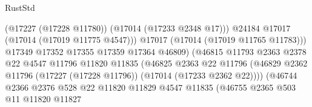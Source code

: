 \begin{lexlean}{RustStd}
\begin{coremodule}
                                                    (@17227 (@17228 @11780))
                                                    (@17014 (@17233 @2348 @17)))
                                                  @24184
                                                  @17017
                                                  (@17014 (@17019 @11775 @4547)))
                                                @17017
                                                (@17014 (@17019 @11765 @11783)))
                                              @17349
                                              @17352
                                              @17355
                                              @17359
                                              @17364
                                              @46809)
                                            (@46815
                                              @11793
                                              @2363
                                              @2378
                                              @22
                                              @4547
                                              @11796
                                              @11820
                                              @11835
                                              (@46825
                                                @2363
                                                @22
                                                @11796
                                                (@46829
                                                  @2362
                                                  @11796
                                                  (@17227 (@17228 @11796))
                                                  (@17014 (@17233 @2362 @22))))
                                              (@46744
                                                @2366
                                                @2376
                                                @528
                                                @22
                                                @11820
                                                @11829
                                                @4547
                                                @11835
                                                (@46755
                                                  @2365
                                                  @503
                                                  @11
                                                  @11820
                                                  @11827

\end{coremodule}
\end{lexlean}
